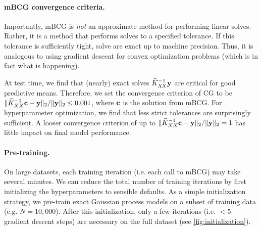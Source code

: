 \paragraph{mBCG convergence criteria.}
Importantly, mBCG is \emph{not} an approximate method for performing linear solves.
Rather, it is a method that performs solves to a specified tolerance.
If this tolerance is sufficiently tight, solve are exact up to machine precision.
Thus, it is analogous to using gradient descent for convex optimization problems (which is in fact what is happening).

At test time, we find that (nearly) exact solves $\widehat {K}_{X \! X}^{-1} \mathbf{y}$  are critical for good predictive means.
Therefore, we set the convergence criterion of CG to be $\Vert \widehat{K}_{XX}^{-1} \mathbf{c} - \mathbf{y} \Vert_2 / \Vert \mathbf{y} \Vert_2 \leq 0.001$, where $\mathbf{c}$ is the solution from mBCG.
For hyperparameter optimization, we find that less strict tolerances are surprisingly sufficient.
A looser convergence criterion of up to $\Vert \widehat{K}_{XX}^{-1} \mathbf{c} - \mathbf{y} \Vert_2 / \Vert \mathbf{y} \Vert_2 = 1$ has little impact on final model performance.


\paragraph{Pre-training.}
On large datasets, each training iteration (i.e. each call to mBCG) may take several minutes.
We can reduce the total number of training iterations by first initializing the hyperparameters to sensible defaults.
As a simple initialization strategy, we pre-train exact Gaussian process models on a subset of training data (e.g. $N=10,\!000$).
After this initialization, only a few iterations (i.e. $< 5$ gradient descent steps) are necessary on the full dataset (see \cref{fig:initialization}).

